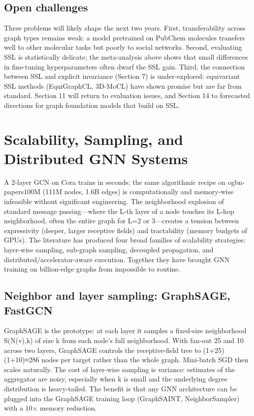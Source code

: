 \documentclass{article}
\begin{document}
\subsection{Open challenges}\label{open-challenges}

Three problems will likely shape the next two years. First, transferability across graph types remains weak: a model pretrained on PubChem molecules transfers well to other molecular tasks but poorly to social networks. Second, evaluating SSL is statistically delicate; the meta-analysis above shows that small differences in fine-tuning hyperparameters often dwarf the SSL gain. Third, the connection between SSL and explicit invariance (Section 7) is under-explored: equivariant SSL methods (EquiGraphCL, 3D-MoCL) have shown promise but are far from standard. Section 11 will return to evaluation issues, and Section 14 to forecasted directions for graph foundation models that build on SSL.
\section{Scalability, Sampling, and Distributed GNN Systems}\label{sec:scalability-sampling-and-distributed-gnn-systems}
A 2-layer GCN on Cora trains in seconds; the same algorithmic recipe on ogbn-papers100M (111M nodes, 1.6B edges) is computationally and memory-wise infeasible without significant engineering. The neighborhood explosion of standard message passing---where the L-th layer of a node touches its L-hop neighborhood, often the entire graph for L=2 or 3---creates a tension between expressivity (deeper, larger receptive fields) and tractability (memory budgets of GPUs). The literature has produced four broad families of scalability strategies: layer-wise sampling, sub-graph sampling, decoupled propagation, and distributed/accelerator-aware execution. Together they have brought GNN training on billion-edge graphs from impossible to routine.

\subsection{Neighbor and layer sampling: GraphSAGE, FastGCN}\label{neighbor-and-layer-sampling-graphsage-fastgcn}

GraphSAGE \citep{hamilton2017inductiverepresent} is the prototype: at each layer it samples a fixed-size neighborhood S(N(v),k) of size k from each node's full neighborhood. With fan-out 25 and 10 across two layers, GraphSAGE controls the receptive-field tree to (1+25)(1+10)≈286 nodes per target rather than the whole graph. Mini-batch SGD then scales naturally. The cost of layer-wise sampling is variance: estimates of the aggregator are noisy, especially when k is small and the underlying degree distribution is heavy-tailed. The benefit is that any GNN architecture can be plugged into the GraphSAGE training loop (GraphSAINT, NeighborSampler) with a 10× memory reduction.
\end{document}
